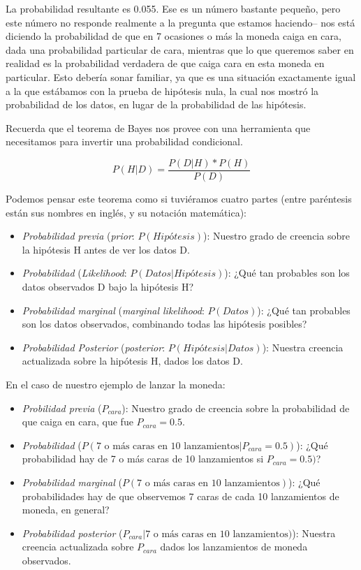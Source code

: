 \documentclass[
  12pt,
]{book}
\providecommand{\tightlist}{%
  \setlength{\itemsep}{0pt}\setlength{\parskip}{0pt}}
\begin{document}
La probabilidad resultante es 0.055. Ese es un número bastante pequeño, pero este número no responde realmente a la pregunta que estamos haciendo-- nos está diciendo la probabilidad de que en 7 ocasiones o más la moneda caiga en cara, dada una probabilidad particular de cara, mientras que lo que queremos saber en realidad es la probabilidad verdadera de que caiga cara en esta moneda en particular. Esto debería sonar familiar, ya que es una situación exactamente igual a la que estábamos con la prueba de hipótesis nula, la cual nos mostró la probabilidad de los datos, en lugar de la probabilidad de las hipótesis.

Recuerda que el teorema de Bayes nos provee con una herramienta que necesitamos para invertir una probabilidad condicional.

\[
P(H|D) = \frac{P(D|H)*P(H)}{P(D)}
\]

Podemos pensar este teorema como si tuviéramos cuatro partes (entre paréntesis están sus nombres en inglés, y su notación matemática):

\begin{itemize}
\tightlist
\item
  \emph{Probabilidad previa} (\emph{prior}: \(P(Hipótesis)\)): Nuestro grado de creencia sobre la hipótesis H antes de ver los datos D.
\item
  \emph{Probabilidad} (\emph{Likelihood}: \(P(Datos|Hipótesis)\)): ¿Qué tan probables son los datos observados D bajo la hipótesis H?
\item
  \emph{Probabilidad marginal} (\emph{marginal likelihood}: \(P(Datos)\)): ¿Qué tan probables son los datos observados, combinando todas las hipótesis posibles?
\item
  \emph{Probabilidad Posterior} (\emph{posterior}: \(P(Hipótesis|Datos)\)): Nuestra creencia actualizada sobre la hipótesis H, dados los datos D.
\end{itemize}

En el caso de nuestro ejemplo de lanzar la moneda:

\begin{itemize}
\tightlist
\item
  \emph{Probilidad previa} (\(P_ {cara}\)): Nuestro grado de creencia sobre la probabilidad de que caiga en cara, que fue \(P_ {cara} = 0.5\).
\item
  \emph{Probabilidad} (\(P(\text{7 o más caras en 10 lanzamientos}|P_{cara}=0.5)\)): ¿Qué probabilidad hay de 7 o más caras de 10 lanzamientos si \(P_{cara}=0.5)\)?
\item
  \emph{Probabilidad marginal} (\(P(\text{7 o más caras en 10 lanzamientos})\)): ¿Qué probabilidades hay de que observemos 7 caras de cada 10 lanzamientos de moneda, en general?
\item
  \emph{Probabilidad posterior} (\(P_{cara}|\text{7 o más caras en 10 lanzamientos})\)): Nuestra creencia actualizada sobre \(P_{cara}\) dados los lanzamientos de moneda observados.
\end{itemize}
\end{document}
